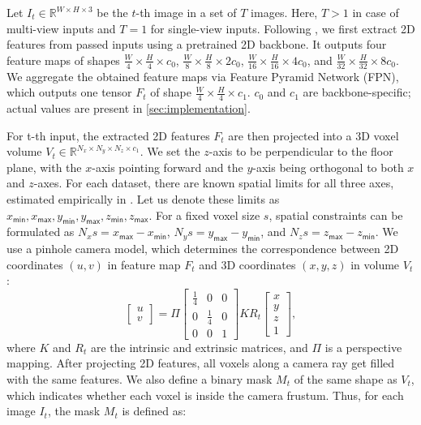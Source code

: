 \documentclass[10pt,twocolumn,letterpaper]{article}
\begin{document}
Let $I_t \in \mathbb{R}^{W \times H \times 3}$ be the $t$-th image in a set of $T$ images. Here, $T > 1$ in case of multi-view inputs and $T = 1$ for single-view inputs. Following \cite{murez2020atlas}, we first extract 2D features from passed inputs using a pretrained 2D backbone. It outputs four feature maps of shapes $\frac{W}{4} \times \frac{H}{4} \times c_0$, $\frac{W}{8} \times \frac{H}{8} \times 2c_0$, $\frac{W}{16} \times \frac{H}{16} \times 4c_0$, and $\frac{W}{32} \times \frac{H}{32} \times 8c_0$. We aggregate the obtained feature maps via Feature Pyramid Network (FPN), which outputs one tensor $F_t$ of shape $\frac{W}{4} \times \frac{H}{4} \times c_1$. $c_0$ and $c_1$ are backbone-specific; actual values are present in \ref{sec:implementation}.

For t-th input, the extracted 2D features $F_t$ are then projected into a 3D voxel volume $V_t \in \mathbb{R}^{N_x \times N_y \times N_z \times c_1}$. We set the $z$-axis to be perpendicular to the floor plane, with the $x$-axis pointing forward and the $y$-axis being orthogonal to both $x$ and $z$-axes. For each dataset, there are known spatial limits for all three axes, estimated empirically in \cite{zhang2020h3dnet, lang2019pointpillars, murez2020atlas}. Let us denote these limits as $x_\mathsf{min}, x_\mathsf{max}, y_\mathsf{min}, y_\mathsf{max}, z_\mathsf{min}, z_\mathsf{max}$. For a fixed voxel size $s$, spatial constraints can be formulated as $N_x s = x_\mathsf{max} - x_\mathsf{min}$, $N_y s = y_\mathsf{max} - y_\mathsf{min}$, and $N_z s = z_\mathsf{max} - z_\mathsf{min}$. We use a pinhole camera model, which determines the correspondence between 2D coordinates $(u, v)$ in feature map $F_t$ and 3D coordinates $(x, y, z)$ in volume $V_t$:
\[
\left[\begin{array}{c} u \\ v \end{array}\right] =
\Pi
\left[ \begin{array}{ccc}
\frac{1}{4} & 0 & 0 \\
0 & \frac{1}{4} & 0 \\
0 & 0 & 1
\end{array} \right] K R_t
\left[\begin{array}{c} x \\ y \\ z \\ 1 \end{array}\right],
\]
where $K$ and $R_t$ are the intrinsic and extrinsic matrices, and $\Pi$ is a perspective mapping. After projecting 2D features, all voxels along a camera ray get filled with the same features. We also define a binary mask $M_t$ of the same shape as $V_t$, which indicates whether each voxel is inside the camera frustum. Thus, for each image $I_t$, the mask $M_t$ is defined as:
\end{document}
